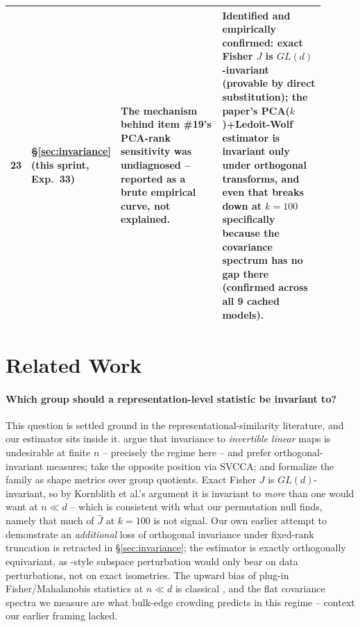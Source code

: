 \documentclass[onecolumn]{jmlr}
\begin{document}
\begin{longtable}{p{0.04\linewidth}p{0.16\linewidth}p{0.35\linewidth}p{0.35\linewidth}}
23 & \S\ref{sec:invariance} (this sprint, Exp.~33) & The mechanism behind item \#19's PCA-rank sensitivity was undiagnosed -- reported as a brute empirical curve, not explained. & Identified and empirically confirmed: exact Fisher $J$ is $GL(d)$-invariant (provable by direct substitution); the paper's PCA($k$)+Ledoit-Wolf estimator is invariant only under orthogonal transforms, and even that breaks down at $k{=}100$ specifically because the covariance spectrum has no gap there (confirmed across all 9 cached models). \\
\bottomrule
\end{longtable}

\FloatBarrier
\section{Related Work}
\label{sec:related}


\paragraph{Which group should a representation-level statistic be invariant to?}
This question is settled ground in the representational-similarity literature,
and our estimator sits inside it. \citet{kornblith2019similarity} argue that
invariance to \emph{invertible linear} maps is undesirable at finite $n$ --
precisely the regime here -- and prefer orthogonal-invariant measures;
\citet{raghu2017svcca} take the opposite position via SVCCA; and
\citet{williams2021shape} formalize the family as shape metrics over group
quotients. Exact Fisher $J$ is $GL(d)$-invariant, so by Kornblith et al.'s
argument it is invariant to \emph{more} than one would want at $n{\ll}d$ --
which is consistent with what our permutation null finds, namely that much of
$\hat J$ at $k{=}100$ is not signal. Our own earlier attempt to demonstrate an
\emph{additional} loss of orthogonal invariance under fixed-rank truncation is
retracted in \S\ref{sec:invariance}; the estimator is exactly orthogonally
equivariant, as \citet{davis1970rotation}-style subspace perturbation would
only bear on data perturbations, not on exact isometries. The upward bias of
plug-in Fisher/Mahalanobis statistics at $n{\ll}d$ is classical
\citep{bickel2004some,fan2008high}, and the flat covariance spectra we measure
are what \citet{marchenko1967distribution} bulk-edge crowding predicts in this
regime -- context our earlier framing lacked.
\end{document}
